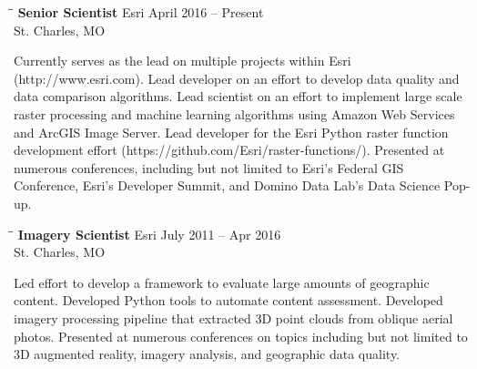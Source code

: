 \documentclass{res}
\begin{document}
\begin{resume}
   \begin{tabbing}
	\hspace{2.3in}\= \hspace{2.6in}\= \kill %
	{\bf Senior Scientist} \>Esri     \>April 2016 -- Present\\
	\>St. Charles, MO
\end{tabbing}\vspace{-20pt}      %
Currently serves as the lead on multiple projects within Esri (http://www.esri.com). Lead developer on an effort to develop data quality and data comparison algorithms. Lead scientist on an effort to implement large scale raster processing and machine learning algorithms using Amazon Web Services and ArcGIS Image Server. Lead developer for the Esri Python raster function development effort (https://github.com/Esri/raster-functions/). Presented at numerous conferences, including but not limited to Esri's Federal GIS Conference, Esri's Developer Summit, and Domino Data Lab's Data Science Pop-up.

   \begin{tabbing}
	\hspace{2.3in}\= \hspace{2.6in}\= \kill %
	{\bf Imagery Scientist} \>Esri     \>July 2011 -- Apr 2016\\
	\>St. Charles, MO
\end{tabbing}\vspace{-20pt}      %
Led effort to develop a framework to evaluate large amounts of geographic content. Developed Python tools to automate content assessment. Developed imagery processing pipeline that extracted 3D point clouds from oblique aerial photos. Presented at numerous conferences on topics including but not limited to 3D augmented reality, imagery analysis, and geographic data quality.


\end{resume}
\end{document}

